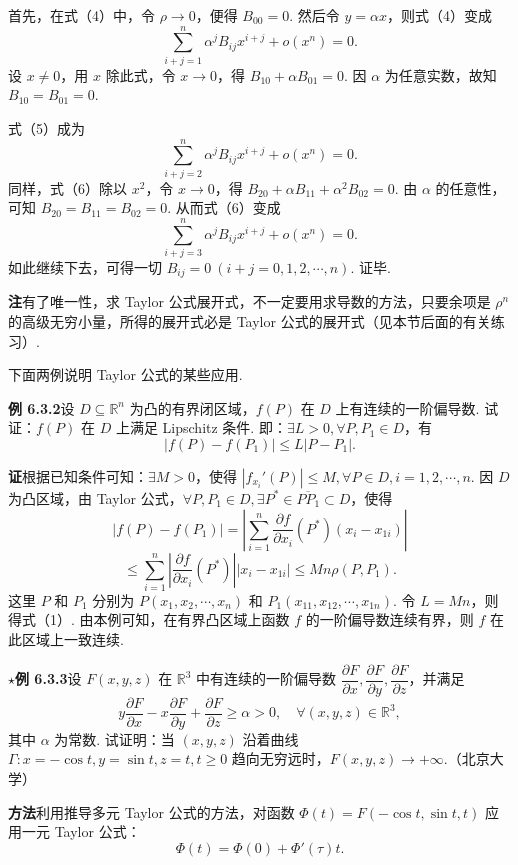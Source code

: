 \documentclass[UTF8, 12pt, fontset=fandol, oneside]{ctexart}
\begin{document}
首先，在式（4）中，令 $\rho\to0$，便得 $B_{00}=0$. 然后令 $y=\alpha x$，则式（4）变成
\[
  \sum_{i+j=1}^{n}\alpha^jB_{ij}x^{i+j}+o(x^n)=0. \tag{5}
\]
设 $x\ne0$，用 $x$ 除此式，令 $x\to0$，得 $B_{10}+\alpha B_{01}=0$. 因 $\alpha$ 为任意实数，故知 $B_{10}=B_{01}=0$.

式（5）成为
\[
  \sum_{i+j=2}^{n}\alpha^jB_{ij}x^{i+j}+o(x^n)=0. \tag{6}
\]
同样，式（6）除以 $x^2$，令 $x\to0$，得 $B_{20}+\alpha B_{11}+\alpha^2B_{02}=0$. 由 $\alpha$ 的任意性，可知 $B_{20}=B_{11}=B_{02}=0$. 从而式（6）变成
\[
  \sum_{i+j=3}^{n}\alpha^jB_{ij}x^{i+j}+o(x^n)=0.
\]
如此继续下去，可得一切 $B_{ij}=0\ (i+j=0,1,2,\cdots,n)$. 证毕.

\noindent\textbf{注}\quad 有了唯一性，求 Taylor 公式展开式，不一定要用求导数的方法，只要余项是 $\rho^n$ 的高级无穷小量，所得的展开式必是 Taylor 公式的展开式（见本节后面的有关练习）.

下面两例说明 Taylor 公式的某些应用.

\noindent\textbf{例 6.3.2}\quad 设 $D\subseteq\mathbb{R}^n$ 为凸的有界闭区域，$f(P)$ 在 $D$ 上有连续的一阶偏导数. 试证：$f(P)$ 在 $D$ 上满足 Lipschitz 条件. 即：$\exists L>0,\forall P,P_1\in D$，有
\[
  |f(P)-f(P_1)|\le L|P-P_1|. \tag{1}
\]

\noindent\textbf{证}\quad 根据已知条件可知：$\exists M>0$，使得 $|f_{x_i}'(P)|\le M,\forall P\in D,i=1,2,\cdots,n$. 因 $D$ 为凸区域，由 Taylor 公式，$\forall P,P_1\in D,\exists P^*\in\overline{PP_1}\subset D$，使得
\[
  |f(P)-f(P_1)|
  =\left|\sum_{i=1}^{n}\frac{\partial f}{\partial x_i}(P^*)(x_i-x_{1i})\right|
\]
\[
  \le\sum_{i=1}^{n}\left|\frac{\partial f}{\partial x_i}(P^*)\right||x_i-x_{1i}|
  \le Mn\rho(P,P_1).
\]
这里 $P$ 和 $P_1$ 分别为 $P(x_1,x_2,\cdots,x_n)$ 和 $P_1(x_{11},x_{12},\cdots,x_{1n})$. 令 $L=Mn$，则得式（1）. 由本例可知，在有界凸区域上函数 $f$ 的一阶偏导数连续有界，则 $f$ 在此区域上一致连续.

\noindent\textbf{\ensuremath{\star}例 6.3.3}\quad 设 $F(x,y,z)$ 在 $\mathbb{R}^3$ 中有连续的一阶偏导数 $\dfrac{\partial F}{\partial x},\dfrac{\partial F}{\partial y},\dfrac{\partial F}{\partial z}$，并满足
\[
  y\frac{\partial F}{\partial x}-x\frac{\partial F}{\partial y}
  +\frac{\partial F}{\partial z}\ge\alpha>0,\quad \forall(x,y,z)\in\mathbb{R}^3,
\]
其中 $\alpha$ 为常数. 试证明：当 $(x,y,z)$ 沿着曲线 $\Gamma:x=-\cos t,y=\sin t,z=t,t\ge0$ 趋向无穷远时，$F(x,y,z)\to+\infty$.（北京大学）

\noindent\textbf{方法}\quad 利用推导多元 Taylor 公式的方法，对函数 $\Phi(t)=F(-\cos t,\sin t,t)$ 应用一元 Taylor 公式：
\[
  \Phi(t)=\Phi(0)+\Phi'(\tau)t.
\]
\end{document}
